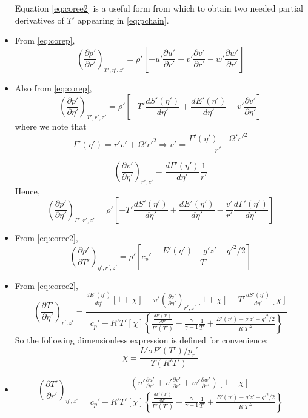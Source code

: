 \documentclass[preprint, prX]{revtex4}
\newcommand{\dd}[2]{\frac{d#1}{d#2}}
\newcommand{\pd}[2]{\frac{\partial#1}{\partial#2}}
\newcommand{\tpd}[3]{\left( \frac{\partial#1}{\partial#2} \right)_{#3}}
\newcommand{\gogmo}{\frac{\gamma}{\gamma-1}}
\begin{document}
\begin{itemize}
Equation \eqref{eq:coree2} is a useful form from which to obtain two needed partial derivatives of $T'$ appearing in \eqref{eq:pchain}.

\item 
From \eqref{eq:corep},
\begin{equation}
\tpd{p'}{r'}{T', \eta', z'} = \rho' \left[ -u' \pd{u'}{r'} - v'\pd{v'}{r'} - w'\pd{w'}{r'} \right]
\end{equation}

\item
Also from \eqref{eq:corep},
\begin{equation}
\tpd{p'}{\eta'}{T', r', z'} = \rho' \left[ -T' \dd{S'(\eta')}{\eta'} + \dd{E'(\eta')}{\eta'} - v' \pd{v'}{\eta'} \right]
\end{equation}
where we note that
\begin{equation}
\Gamma'(\eta') = r'v' + \Omega'r'^2 \Rightarrow v' = \frac{\Gamma'(\eta') - \Omega'r'^2}{r'}
\end{equation}

\begin{equation}
\tpd{v'}{\eta'}{r',z'} = \dd{\Gamma'(\eta')}{\eta'}\frac{1}{r'} \end{equation}
Hence,
\begin{equation}
\tpd{p'}{\eta'}{\Gamma',r',z'} = \rho' \left[ -T' \dd{S'(\eta')}{\eta'} + \dd{E'(\eta')}{\eta'} - \frac{v'}{r'} \dd{\Gamma'(\eta')}{\eta'} \right] 
\end{equation}

\item
From \eqref{eq:coree2},
\begin{equation}
\tpd{p'}{T'}{\eta', r', z'} = \rho' \left[ c_p'- \frac{E'(\eta') -g'z' - q'^2/2}{T'} \right]
\end{equation}

\item
From \eqref{eq:coree2},
\begin{equation}
\tpd{T'}{\eta'}{r',z'} = \frac{ \dd{E'(\eta')}{\eta'}[1+\chi] - v' \tpd{v'}{\eta'}{r',z'} [1+\chi] - T' \dd{S'(\eta')}{\eta'} [\chi]}{c_p' + R'T'[\chi]\left\{ \frac{\dd{P'(T')}{T'}}{P'(T')} - \gogmo \frac{1}{T'} + \frac{E'(\eta') - g'z'-q'^2/2}{R'T'^2}\right\} }
\end{equation}
So the following dimensionless expression is defined for convenience: 
\begin{equation}
\chi \equiv \frac{L'\sigma P'(T')/p_r'}{\Upsilon(R' T')} 
\end{equation}

\item
\begin{equation}
\tpd{T'}{r'}{\eta',z'} = \frac{-\left( u'\pd{u'}{r'} + v' \pd{v'}{r'} + w'\pd{w'}{r'}\right)\left[ 1 + \chi\right]}{c_p' + R'T'[\chi] \left\{ \frac{\dd{P'(T')}{T'}}{P'(T')} - \gogmo \frac{1}{T'} + \frac{E'(\eta') - g'z'-q'^2/2}{R'T'^2}  \right\}}
\end{equation}


\end{itemize}
\end{document}
